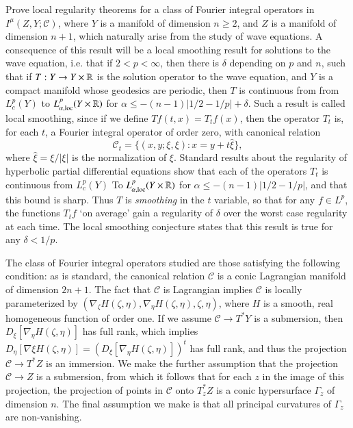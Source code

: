 Prove local regularity theorems for a class of Fourier integral operators in $I^\mu(Z,Y;\mathcal{C})$, where $Y$ is a manifold of dimension $n \geq 2$, and $Z$ is a manifold of dimension $n+1$, which naturally arise from the study of wave equations. A consequence of this result will be a local smoothing result for solutions to the wave equation, i.e. that if $2 < p < \infty$, then there is $\delta$ depending on $p$ and $n$, such that if $T: Y \to Y \times \operatorname{\mathbb{R}}$ is the solution operator to the wave equation, and $Y$ is a compact manifold whose geodesics are periodic, then $T$ is continuous from from $L^p_c(Y)$ to $L^p_{\alpha,\text{loc}}(Y \times \operatorname{\mathbb{R}})$ for $\alpha \leq -(n-1)|1/2 - 1/p| + \delta$. Such a result is called local smoothing, since if we define $Tf(t,x) = T_tf(x)$, then the operator $T_t$ is, for each $t$, a Fourier integral operator of order zero, with canonical relation
%
\[ \mathcal{C}_t = \{ (x,y;\xi,\xi) : x = y + t \widehat{\xi} \}, \]
%
where $\widehat{\xi} = \xi / |\xi|$ is the normalization of $\xi$. Standard results about the regularity of hyperbolic partial differential equations show that each of the operators $T_t$ is continuous from $L^p_c(Y)$ To $L^p_{\alpha,\text{loc}}(Y \times \operatorname{\mathbb{R}})$ for $\alpha \leq -(n-1)|1/2 - 1/p|$, and that this bound is sharp. Thus $T$ is \emph{smoothing} in the $t$ variable, so that for any $f \in L^p$, the functions $T_t f$ `on average' gain a regularity of $\delta$ over the worst case regularity at each time. The local smoothing conjecture states that this result is true for any $\delta < 1/p$.

The class of Fourier integral operators studied are those satisfying the following condition: as is standard, the canonical relation $\mathcal{C}$ is a conic Lagrangian manifold of dimension $2n + 1$. The fact that $\mathcal{C}$ is Lagrangian implies $\mathcal{C}$ is locally parameterized by $(\nabla_\zeta H(\zeta, \eta), \nabla_\eta H(\zeta, \eta),\zeta,\eta)$, where $H$ is a smooth, real homogeneous function of order one. If we assume $\mathcal{C} \to T^* Y$ is a submersion, then $D_\xi [\nabla_\eta H(\zeta,\eta)]$ has full rank, which implies $D_\eta [\nabla \xi H(\zeta, \eta)] = (D_\xi [\nabla_\eta H(\zeta, \eta)])^t$ has full rank, and thus the projection $\mathcal{C} \to T^* Z$ is an immersion. We make the further assumption that the projection $\mathcal{C} \to Z$ is a submersion, from which it follows that for each $z$ in the image of this projection, the projection of points in $\mathcal{C}$ onto $T^*_z Z$ is a conic hypersurface $\Gamma_z$ of dimension $n$. The final assumption we make is that all principal curvatures of $\Gamma_z$ are non-vanishing.


